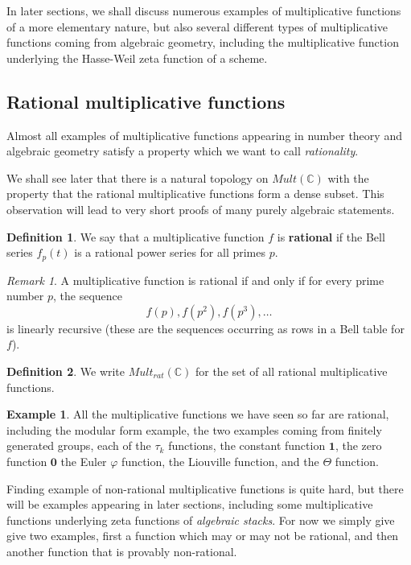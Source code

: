 \documentclass[a4paper]{article}
\theoremstyle{definition}
\newtheorem{definition}{Definition}[section]
\newtheorem{example}{Example}[section]
\theoremstyle{remark}
\newtheorem*{remark}{Remark}
\newcommand{\one}{\mathbf{1}}
\newcommand{\zero}{\mathbf{0}}
\newcommand{\C}{\mathbb{C}}
\newcommand{\defhl}[1]{\textbf{#1}}
\begin{document}
In later sections, we shall discuss numerous examples of multiplicative functions of a more elementary nature, but also several different types of multiplicative functions coming from algebraic geometry, including the multiplicative function underlying the Hasse-Weil zeta function of a scheme.

\subsection{Rational multiplicative functions}

Almost all examples of multiplicative functions appearing in number theory and algebraic geometry satisfy a property which we want to call \emph{rationality}. 

We shall see later that there is a natural topology on $Mult(\C)$ with the property that the rational multiplicative functions form a dense subset. This observation will lead to very short proofs of many purely algebraic statements.

\begin{definition}
We say that a multiplicative function $f$ is \defhl{rational} if the Bell series $f_p(t)$ is a rational power series for all primes $p$.
\end{definition}

\begin{remark}
A multiplicative function is rational if and only if for every prime number $p$, the sequence
$$ f(p), f(p^2), f(p^3), \ldots  $$
is linearly recursive (these are the sequences occurring as rows in a Bell table for $f$). 
\end{remark}

\begin{definition}
We write $Mult_{rat}(\C)$ for the set of all rational multiplicative functions.
\end{definition}

\begin{example}
All the multiplicative functions we have seen so far are rational, including the modular form example, the two examples coming from finitely generated groups, each of the $\tau_k$ functions, the constant function $\one$, the zero function $\zero$ the Euler $\varphi$ function, the Liouville function, and the $\Theta$ function.
\end{example}

Finding example of non-rational multiplicative functions is quite hard, but there will be examples appearing in later sections, including some multiplicative functions underlying zeta functions of \emph{algebraic stacks}. For now we simply give give two examples, first a function which may or may not be rational, and then another function that is provably non-rational.
\end{document}
